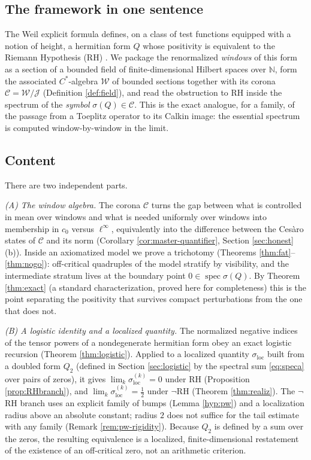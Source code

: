 \documentclass[11pt,reqno]{amsart}
\theoremstyle{definition}
\newcommand{\W}{\mathcal{W}}
\newcommand{\Jc}{\mathcal{J}}
\newcommand{\Cor}{\mathcal{C}}
\newcommand{\spec}{\operatorname{spec}}
\newcommand{\N}{\mathbb{N}}
\newcommand{\half}{\tfrac12}
\begin{document}
\subsection{The framework in one sentence}
The Weil explicit formula defines, on a class of test functions equipped with a
notion of height, a hermitian form \(Q\) whose positivity is equivalent to the
Riemann Hypothesis (RH) \cite{Weil1952}. We package the renormalized
\emph{windows} of this form as a section of a bounded field of
finite-dimensional Hilbert spaces over \(\N\), form the associated
\(C^*\)-algebra \(\W\) of
bounded sections together with its corona \(\Cor=\W/\Jc\) (Definition
\ref{def:field}), and read the obstruction to RH inside the spectrum of the
\emph{symbol} \(\sigma(Q)\in\Cor\). This is the exact analogue, for a family,
of the passage from a Toeplitz operator to its Calkin image: the essential
spectrum is computed window-by-window in the limit.

\subsection{Content}
There are two independent parts.

\emph{(A) The window algebra.} The corona \(\Cor\) turns the gap between what
is controlled in mean over windows and what is needed uniformly over windows
into membership in \(c_0\) versus \(\ell^\infty\), equivalently into the
difference between the Ces\`aro states of \(\Cor\) and its norm (Corollary
\ref{cor:master-quantifier}, Section \ref{sec:honest}(b)). Inside an axiomatized model
we prove a trichotomy (Theorems \ref{thm:fat}--\ref{thm:nogo}): off-critical
quadruples of the model stratify by visibility, and the intermediate stratum
lives at the boundary point \(0\in\spec\sigma(Q)\). By Theorem \ref{thm:exact}
(a standard characterization, proved here for completeness) this is the point
separating the positivity that survives compact perturbations from the one that
does not.

\emph{(B) A logistic identity and a localized quantity.} The normalized negative
indices of the tensor powers of a nondegenerate hermitian form obey an exact
logistic recursion (Theorem \ref{thm:logistic}). Applied to a localized quantity
\(\sigma_{\mathrm{loc}}\) built from a doubled form \(Q_2\) (defined in Section
\ref{sec:logistic} by the spectral sum \eqref{eq:speca} over pairs of zeros), it
gives \(\lim_k\sigma_{\mathrm{loc}}^{(k)}=0\) under RH (Proposition
\ref{prop:RHbranch}), and \(\lim_k\sigma_{\mathrm{loc}}^{(k)}=\half\) under
\(\neg\)RH (Theorem \ref{thm:realiz}). The \(\neg\)RH branch uses an explicit
family of bumps (Lemma \ref{hyp:pw}) and a localization radius above an
absolute constant; radius \(2\) does not suffice for the tail estimate with any
family (Remark \ref{rem:pw-rigidity}). Because \(Q_2\) is defined by a sum over
the zeros, the resulting equivalence is a localized, finite-dimensional
restatement of the existence of an off-critical zero, not an arithmetic
criterion.
\end{document}

